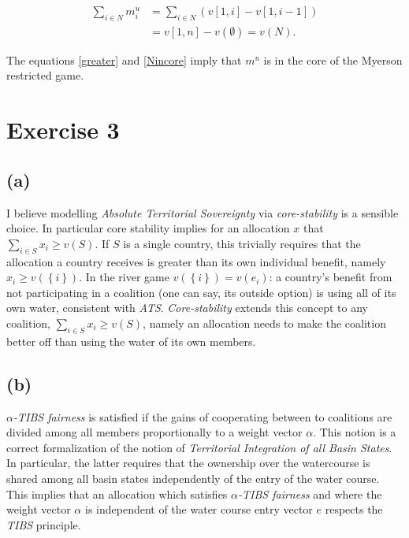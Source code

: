\documentclass[american]{scrartcl}
\newcommand{\set}[1]{\left\{#1\right\}}
\begin{document}
\begin{equation} \label{Nincore}
    \begin{split}
        \sum_{i \in N} m^u_i &= \sum_{i \in N} \left(v[1, i] - v[1, i-1]\right) \\
        &= v[1, n] - v(\emptyset) = v(N).
    \end{split}
\end{equation}

The equations \ref{greater} and \ref{Nincore} imply that $m^u$ is in the core of the Myerson restricted game.

\section*{Exercise 3}

\subsection*{(a)}

I believe modelling \textit{Absolute Territorial Sovereignty} via \textit{core-stability} is a sensible choice. In particular core stability implies for an allocation $x$ that $\sum_{i \in S} x_i \geq v(S)$. If $S$ is a single country, this trivially requires that the allocation a country receives is greater than its own individual benefit, namely $x_i \geq v(\set{i})$. In the river game $v(\set{i}) = v(e_i)$: a country's benefit from not participating in a coalition (one can say, its outside option) is using all of its own water, consistent with \textit{ATS}. \textit{Core-stability} extends this concept to any coalition, $\sum_{i \in S} x_i \geq v(S)$, namely an allocation needs to make the coalition better off than using the water of its own members.

\subsection*{(b)}

$\alpha$\textit{-TIBS fairness} is satisfied if the gains of cooperating between to coalitions are divided among all members proportionally to a weight vector $\alpha$. This notion is a correct formalization of the notion of \textit{Territorial Integration of all Basin States}. In particular, the latter requires that the ownership over the watercourse is shared among all basin states independently of the entry of the water course. This implies that an allocation which satisfies $\alpha$\textit{-TIBS fairness} and where the weight vector $\alpha$ is independent of the water course entry vector $e$ respects the \textit{TIBS} principle.
\end{document}
